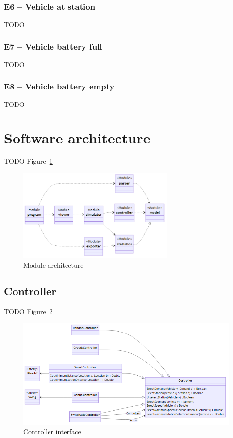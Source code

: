 \documentclass{article}
\begin{document}
    \subsubsection{E6 -- Vehicle at station}
    TODO

    \subsubsection{E7 -- Vehicle battery full}
    TODO

    \subsubsection{E8 -- Vehicle battery empty}
    TODO

    \section{Software architecture}
    \label{sec:arch}
    TODO Figure~\ref{fig:0}

    \begin{figure}[htbp]
        \centering
        \includegraphics[width=0.7\textwidth]{../../diagrams/architecture.png}
        \caption{Module architecture}
        \label{fig:0}
    \end{figure}

    \subsection{Controller}
    \label{sec:controller}
    TODO Figure~\ref{fig:2}

    \begin{figure}[htbp]
        \centering
        \includegraphics[width=\textwidth]{../../diagrams/controller/classes.png}
        \caption{Controller interface}
        \label{fig:2}
    \end{figure}
\end{document}
